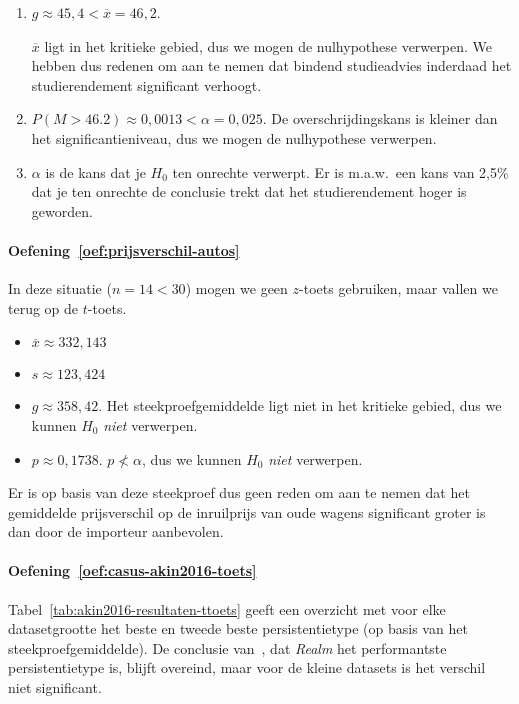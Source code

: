 \begin{enumerate}
  \item $g \approx 45,4 < \overline{x} = 46,2$.
  
  $\overline{x}$ ligt in het kritieke gebied, dus we mogen de nulhypothese verwerpen. We hebben dus redenen om aan te nemen dat bindend studieadvies inderdaad het studierendement significant verhoogt.
  
  \item $P(M > 46.2) \approx 0,0013 < \alpha = 0,025$. De overschrijdingskans is kleiner dan het significantieniveau, dus we mogen de nulhypothese verwerpen.
  
  \item  $\alpha$ is de kans dat je $H_{0}$ ten onrechte verwerpt. Er is m.a.w.~een kans van 2,5\% dat je ten onrechte de conclusie trekt dat het studierendement hoger is geworden.
\end{enumerate}

\paragraph{Oefening~\ref{oef:prijsverschil-autos}}

In deze situatie ($n = 14 < 30$) mogen we geen $z$-toets gebruiken, maar vallen we terug op de $t$-toets.

\begin{itemize}
  \item $\overline{x} \approx 332,143$
  \item $s \approx 123,424$
  \item $g \approx 358,42$. Het steekproefgemiddelde ligt niet in het kritieke gebied, dus we kunnen $H_0$ \emph{niet} verwerpen.
  \item $p \approx 0,1738$. $p \nless \alpha$, dus we kunnen $H_0$ \emph{niet} verwerpen.
\end{itemize}

Er is op basis van deze steekproef dus geen reden om aan te nemen dat het gemiddelde prijsverschil op de inruilprijs van oude wagens significant groter is dan door de importeur aanbevolen.

\paragraph{Oefening~\ref{oef:casus-akin2016-toets}}

Tabel~\ref{tab:akin2016-resultaten-ttoets} geeft een overzicht met voor elke datasetgrootte het beste en tweede beste persistentietype (op basis van het steekproefgemiddelde). De conclusie van~\textcite{Akin2016}, dat \emph{Realm} het performantste persistentietype is, blijft overeind, maar voor de kleine datasets is het verschil niet significant.

